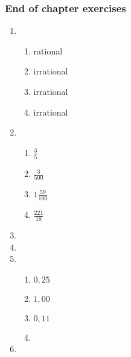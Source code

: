 {\begin{multicols}{3}

\subsubsection*{End of chapter exercises} %

\begin{enumerate}[noitemsep, label=\textbf{\arabic*}. ] 
\item%
    \begin{enumerate}[noitemsep, label=\textbf{(\alph*)} ] 
    \item rational%
    \item irrational%
    \item irrational%
    \item irrational%
    \end{enumerate}
\item %
    \begin{enumerate}[noitemsep, label=\textbf{(\alph*)} ] 
    \item $\frac{3}{5}$%
    \item $\frac{3}{500}$%
    \item $1\frac{59}{100}$%
    \item $\frac{221}{18}$%
    \end{enumerate}
\item %
\item %


\item %
    \begin{enumerate}[noitemsep, label=\textbf{(\alph*)} ]  
    \item $0,25$%
    \item $1,00$%
    \item $0,11$%
    \item%
    \end{enumerate}

\item %


\end{enumerate}
\end{multicols}}
